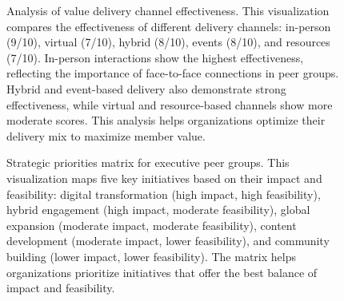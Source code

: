 \documentclass[conference]{IEEEtran}
\begin{document}
\begin{figure}[t]
\centering
{}
\caption{Analysis of value delivery channel effectiveness. 
This visualization compares the effectiveness of different delivery channels: 
in-person (9/10), virtual (7/10), hybrid (8/10), events (8/10), and resources (7/10). 
In-person interactions show the highest effectiveness, reflecting the importance of 
face-to-face connections in peer groups. Hybrid and event-based delivery also demonstrate 
strong effectiveness, while virtual and resource-based channels show more moderate scores. 
This analysis helps organizations optimize their delivery mix to maximize member value.}
\label{fig:delivery_channels}
\end{figure}

\begin{figure}[t]
\centering
{}
\caption{Strategic priorities matrix for executive peer groups. 
This visualization maps five key initiatives based on their impact and feasibility: 
digital transformation (high impact, high feasibility), hybrid engagement (high impact, 
moderate feasibility), global expansion (moderate impact, moderate feasibility), 
content development (moderate impact, lower feasibility), and community building 
(lower impact, lower feasibility). The matrix helps organizations prioritize initiatives 
that offer the best balance of impact and feasibility.}
\label{fig:priorities_matrix}
\end{figure}
\end{document}
